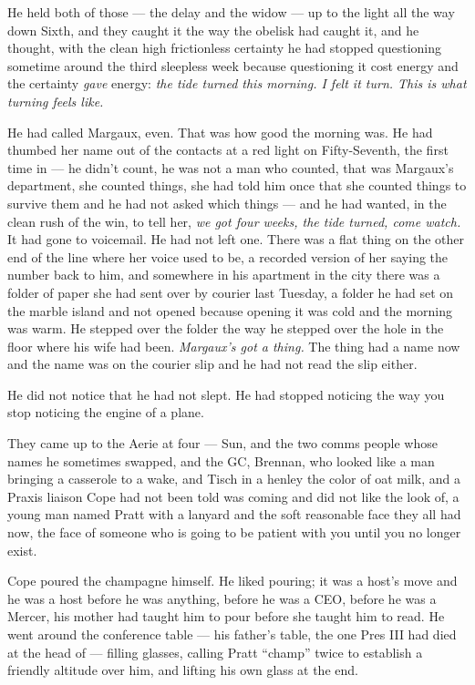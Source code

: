 \documentclass[11pt,openany]{book}
\newcommand{\scenebreak}{\par\vspace{0.5\baselineskip}\begin{center}\textasteriskcentered\quad\textasteriskcentered\quad\textasteriskcentered\end{center}\vspace{0.5\baselineskip}\par}
\begin{document}
He held both of those --- the delay and the widow --- up to the light all the way down Sixth, and they caught it the way the obelisk had caught it, and he thought, with the clean high frictionless certainty he had stopped questioning sometime around the third sleepless week because questioning it cost energy and the certainty \textit{gave} energy: \textit{the tide turned this morning. I felt it turn. This is what turning feels like.}

He had called Margaux, even. That was how good the morning was. He had thumbed her name out of the contacts at a red light on Fifty-Seventh, the first time in --- he didn't count, he was not a man who counted, that was Margaux's department, she counted things, she had told him once that she counted things to survive them and he had not asked which things --- and he had wanted, in the clean rush of the win, to tell her, \textit{we got four weeks, the tide turned, come watch.} It had gone to voicemail. He had not left one. There was a flat thing on the other end of the line where her voice used to be, a recorded version of her saying the number back to him, and somewhere in his apartment in the city there was a folder of paper she had sent over by courier last Tuesday, a folder he had set on the marble island and not opened because opening it was cold and the morning was warm. He stepped over the folder the way he stepped over the hole in the floor where his wife had been. \textit{Margaux's got a thing.} The thing had a name now and the name was on the courier slip and he had not read the slip either.

He did not notice that he had not slept. He had stopped noticing the way you stop noticing the engine of a plane.


\scenebreak


They came up to the Aerie at four --- Sun, and the two comms people whose names he sometimes swapped, and the GC, Brennan, who looked like a man bringing a casserole to a wake, and Tisch in a henley the color of oat milk, and a Praxis liaison Cope had not been told was coming and did not like the look of, a young man named Pratt with a lanyard and the soft reasonable face they all had now, the face of someone who is going to be patient with you until you no longer exist.

Cope poured the champagne himself. He liked pouring; it was a host's move and he was a host before he was anything, before he was a CEO, before he was a Mercer, his mother had taught him to pour before she taught him to read. He went around the conference table --- his father's table, the one Pres III had died at the head of --- filling glasses, calling Pratt ``champ'' twice to establish a friendly altitude over him, and lifting his own glass at the end.
\end{document}
